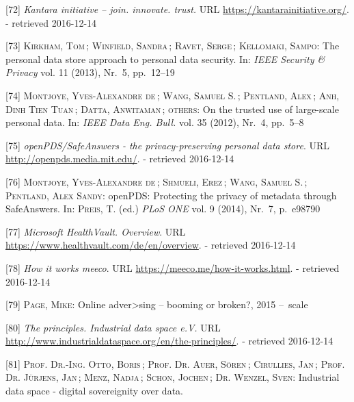 \documentclass[12pt,english,a4paper,titlepage,cleardoublepage=empty,dottedtoc]{report}
\begin{document}
\hypertarget{ref-web_kantara-initiative}{}
{[}72{]} \emph{Kantara initiative -- join. innovate. trust.} URL
\url{https://kantarainitiative.org/}. - retrieved 2016-12-14

\hypertarget{ref-paper_2014_personal-data-store-approach}{}
{[}73{]} \textsc{Kirkham, Tom}\,; \textsc{Winfield, Sandra}\,;
\textsc{Ravet, Serge}\,; \textsc{Kellomaki, Sampo}: The personal data
store approach to personal data security. In: \emph{IEEE Security \&
Privacy} vol. 11 (2013), Nr.~5, pp.~12--19

\hypertarget{ref-paper_2012_openpds_on-trusted-use-of-large-scale-personal-data}{}
{[}74{]} \textsc{Montjoye, Yves-Alexandre de}\,; \textsc{Wang, Samuel
S.}\,; \textsc{Pentland, Alex}\,; \textsc{Anh, Dinh Tien Tuan}\,;
\textsc{Datta, Anwitaman}\,; \textsc{others}: On the trusted use of
large-scale personal data. In: \emph{IEEE Data Eng. Bull.} vol. 35
(2012), Nr.~4, pp.~5--8

\hypertarget{ref-web_mit_openpds-safeanswers-project-page}{}
{[}75{]} \emph{openPDS/SafeAnswers - the privacy-preserving personal
data store}. URL \url{http://openpds.media.mit.edu/}. - retrieved
2016-12-14

\hypertarget{ref-paper_2014_openpds_protecting-privacy-of-meta-data-through-safeanswers}{}
{[}76{]} \textsc{Montjoye, Yves-Alexandre de}\,; \textsc{Shmueli,
Erez}\,; \textsc{Wang, Samuel S.}\,; \textsc{Pentland, Alex Sandy}:
openPDS: Protecting the privacy of metadata through SafeAnswers. In:
\textsc{Preis, T.} (ed.) \emph{PLoS ONE} vol. 9 (2014), Nr.~7, p.~e98790

\hypertarget{ref-web_microsoft_healthvault}{}
{[}77{]} \emph{Microsoft HealthVault. Overview}. URL
\url{https://www.healthvault.com/de/en/overview}. - retrieved 2016-12-14

\hypertarget{ref-web_meeco_how-it-works}{}
{[}78{]} \emph{How it works meeco}. URL
\url{https://meeco.me/how-it-works.html}. - retrieved 2016-12-14

\hypertarget{ref-slides_2015_meeco-case-study}{}
{[}79{]} \textsc{Page, Mike}: Online adver\textgreater{}sing -- booming
or broken?, 2015 --~scale

\hypertarget{ref-web_industrial-data-space}{}
{[}80{]} \emph{The principles. Industrial data space e.V.} URL
\url{http://www.industrialdataspace.org/en/the-principles/}. - retrieved
2016-12-14

\hypertarget{ref-whitepaper_2016_industrial-data-space}{}
{[}81{]} \textsc{Prof. Dr.-Ing. Otto, Boris}\,; \textsc{Prof. Dr. Auer,
Sören}\,; \textsc{Cirullies, Jan}\,; \textsc{Prof. Dr. Jürjens, Jan}\,;
\textsc{Menz, Nadja}\,; \textsc{Schon, Jochen}\,; \textsc{Dr. Wenzel,
Sven}: Industrial data space - digital sovereignity over data.
\end{document}
